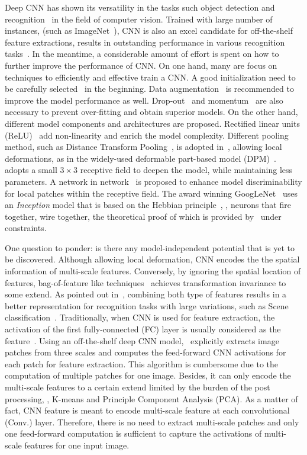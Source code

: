 \documentclass[10pt,twocolumn,letterpaper]{article}
\begin{document}
Deep CNN has shown its versatility in the tasks such object detection and recognition~\cite{AlexNet, overfeat, veryDeep, GoogLeNet, nin} in the field of computer vision. Trained with large number of instances, (such as ImageNet~\cite{ImageNet}), CNN is also an excel candidate for off-the-shelf feature extractions, results in outstanding performance in various recognition tasks~\cite{cnn_baseline}. In the meantime, a considerable amount of effort is spent on how to further improve the performance of CNN. On one hand, many are focus on techniques to efficiently and effective train a CNN. A good initialization need to be carefully selected~\cite{diff_cnn} in the beginning. Data augmentation~\cite{AlexNet} is recommended to improve the model performance as well. Drop-out~\cite{dropout} and momentum~\cite{momentum} are also necessary to prevent over-fitting and obtain superior models. On the other hand, different model components and architectures are proposed. Rectified linear units (ReLU)~\cite{AlexNet} add non-linearity and enrich the model complexity. Different pooling method, such as Distance Transform Pooling~\cite{dist_trans}, is adopted in~\cite{dpm_is_cnn}, allowing local deformations, as in the widely-used deformable part-based model (DPM)~\cite{dpm}. \cite{veryDeep} adopts a small $3\times 3$ receptive field to deepen the model, while maintaining less parameters. A network in network~\cite{nin} is proposed to enhance model discriminability for local patches within the receptive field. The award winning GoogLeNet~\cite{GoogLeNet} uses an \textit{Inception} model that is based on the Hebbian principle~\cite{Hebb}, \ie, neurons that fire together, wire together, the theoretical proof of which is provided by~\cite{dnn_proof} under constraints. 

One question to ponder: is there any model-independent potential that is yet to be discovered. Although allowing local deformation, CNN encodes the the spatial information of multi-scale features. Conversely, by ignoring the spatial location of features, bag-of-feature like techniques~\cite{spatial_pyramid} achieves transformation invariance to some extend. As pointed out in~\cite{Gong14}, combining both type of features results in a better representation for recognition tasks with large variations, such as Scene classification~\cite{SUN397,MIT67}. Traditionally, when CNN is used for feature extraction, the activation of the first fully-connected (FC) layer is usually considered as the feature~\cite{overfeat, Gong14}. Using an off-the-shelf deep CNN model,~\cite{Gong14} explicitly extracts image patches from three scales and computes the feed-forward CNN activations for each patch for feature extraction. This algorithm is cumbersome due to the computation of multiple patches for one image. Besides, it can only encode the multi-scale features to a certain extend limited by the burden of the post processing, \ie, K-means and Principle Component Analysis (PCA). As a matter of fact, CNN feature is meant to encode multi-scale feature at each convolutional (Conv.) layer. Therefore, there is no need to extract multi-scale patches and only one feed-forward computation is sufficient to capture the activations of multi-scale features for one input image. 
\end{document}
